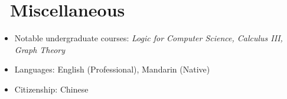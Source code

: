 \documentclass{resume}
\begin{document}

\section{\faInfo\ Miscellaneous}
\begin{itemize}[parsep=0.5ex]
  \item Notable undergraduate courses:
      \textit{Logic for Computer Science, Calculus III, Graph Theory}
  \item Languages: English (Professional), Mandarin (Native)
  \item Citizenship: Chinese
\end{itemize}



\phantom{}
\end{document}

